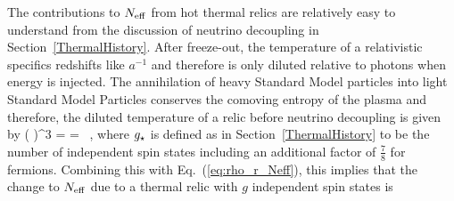 The contributions to $N_{\rm eff}$ from hot thermal relics are relatively easy to understand from the discussion of neutrino decoupling in Section~\ref{ThermalHistory}.  After freeze-out, the temperature of a relativistic specifics redshifts like $a^{-1}$ and therefore is only diluted relative to photons when energy is injected.  The annihilation of heavy Standard Model particles into light Standard Model Particles conserves the comoving entropy of the plasma and therefore, the diluted temperature of a relic before neutrino decoupling is given by
\beq
\left(  \right)^3 = =  \, ,
\eeq
where $g_{\star}$ is defined as in Section~\ref{ThermalHistory} to be the number of independent spin states including an additional factor of $\frac{7}{8}$ for fermions.  Combining this with Eq.~(\ref{eq:rho_r_Neff}), this implies that the change to $N_{\rm eff}$ due to a thermal relic with $g$ independent spin states is
